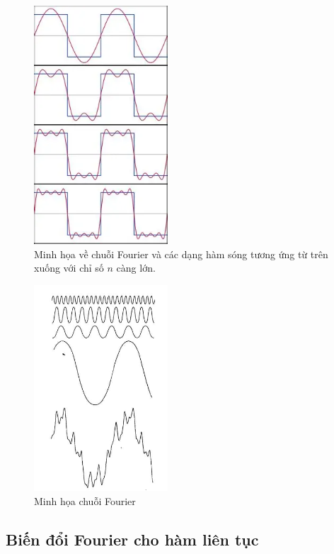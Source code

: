 \documentclass[12pt,a4paper]{report}
\numberwithin{equation}{section}
\theoremstyle{definition} %
\begin{document}
     \begin{figure}[H]
		 \centering
		 \includegraphics[width=5cm]{img/fourier.png}
		 \caption{Minh họa về chuỗi Fourier và các dạng hàm sóng tương ứng từ trên xuống với chỉ số $n$ càng lớn.}
		 \end{figure}
		 \begin{figure}[H]
		 \centering
		 \includegraphics[width=5cm]{img/fourier1.png}
		 \caption{Minh họa chuỗi Fourier}
		 \end{figure}
\subsection{Biến đổi Fourier cho hàm liên tục}
\end{document}
